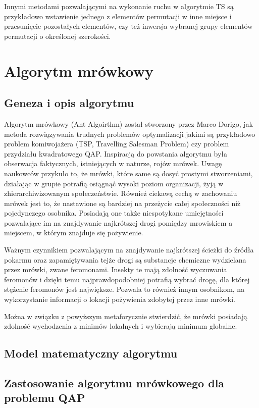 Innymi metodami pozwalającymi na wykonanie ruchu w algorytmie TS są przykładowo wstawienie jednego z elementów permutacji w inne miejsce i przesunięcie pozostałych elementów, czy też inwersja wybranej grupy elementów permutacji o określonej szerokości.
\section{Algorytm mrówkowy}
\label{sec:mrowka}
\subsection{Geneza i opis algorytmu}
Algorytm mrówkowy (Ant Algoirthm) został stworzony przez Marco Dorigo, jak metoda rozwiązywania trudnych problemów optymalizacji jakimi są przykładowo problem komiwojażera (TSP, Travelling Salesman Problem) czy problem przydziału kwadratowego QAP. Inspiracją do powstania algorytmu była obserwacja faktycznych, istniejących w naturze, rojów mrówek. Uwagę naukowców przykuło to, że mrówki, które same są dosyć prostymi stworzeniami, działając w grupie potrafią osiągnąć wysoki poziom organizacji, żyją w zhierarchiwizowanym społeczeństwie. Również ciekawą cechą w zachowaniu mrówek jest to, że nastawione są bardziej na przeżycie całej społeczności niż pojedynczego osobnika. Posiadają one także niespotykane umiejętności pozwalające im na znajdywanie najkrótszej drogi pomiędzy mrowiskiem a     miejscem, w którym znajduje się pożywienie.

Ważnym czynnikiem pozwalającym na znajdywanie najkrótszej ścieżki do źródła pokarmu oraz zapamiętywania tejże drogi są substancje chemiczne wydzielana przez mrówki, zwane feromonami. Insekty te mają zdolność wyczuwania feromonów i dzięki temu najprawdopodobniej potrafią wybrać drogę, dla której stężenie feromonów jest największe. Pozwala to również innym osobnikom, na wykorzystanie informacji o lokacji pożywienia zdobytej przez inne mrówki.

Można w związku z powyższym metaforycznie stwierdzić, że mrówki posiadają zdolność wychodzenia z minimów lokalnych i wybierają minimum globalne.

\subsection{Model matematyczny algorytmu}
\subsection{Zastosowanie algorytmu mrówkowego dla problemu QAP}

